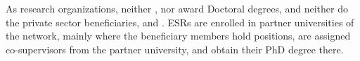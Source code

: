 As research organizations, neither \cernentity, nor \nikhefentity award Doctoral degrees, and neither do the private sector beneficiaries, \dqentity and \ibmentity. ESRs are enrolled in partner universities of the network, mainly where the beneficiary members hold positions, are assigned co-supervisors from the partner university, and obtain their PhD degree there. 






